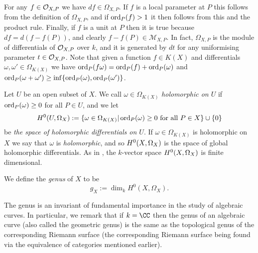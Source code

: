 For any $f \in {\cal O}_{X,P}$ we have $df \in \Omega_{X,P}$.
If $f$ is a local parameter at $P$ this follows from the definition of $\Omega_{X,P}$, and if $\operatorname{ord}_P(f) >1$ it then follows from this and the product rule.
Finally, if $f$ is a unit at $P$ then it is true because $df = d(f - f(P))$, and clearly $f - f(P) \in \mathcal{M}_{X,P}$.
In fact, $\Omega_{X,P}$ is the module of differentials of ${\cal O}_{X,P}$ over $k$, and it is generated by $dt$ for any uniformising parameter $t \in {\cal O}_{X,P}$.
Note that given a function $f \in K(X)$ and differentials $\omega, \omega' \in \Omega_{K(X)}$ we have $\operatorname{ord}_P(f\omega) = \operatorname{ord}_P(f) + \operatorname{ord}_P(\omega)$ and $\operatorname{ord}_P(\omega + \omega') \geq \inf\{\operatorname{ord}_P(\omega), \operatorname{ord}_P(\omega')\}$.


Let $U$ be an open subset of $X$.
We call $\omega \in \Omega_{K(X)}$ \emph{holomorphic on $U$} if $\operatorname{ord}_P(\omega) \geq 0$ for all $P \in U$, and we let
    \[
    H^0(U, \Omega_X) := \{ \omega \in \Omega_{K(X)} | \operatorname{ord}_P(\omega) \geq 0\ \text{for all}\ P \in X\} \cup \{ 0 \}
    \]
be \emph{the space of holomorphic differentials on $U$}.
If $\omega \in \Omega_{K(X)}$ is holomorphic on $X$ we say that $\omega$ is \emph{holomorphic}, and so ${H^0(X,\Omega_X)}$ is the space of global holomorphic differentials.
As in \cite[Chap.\ 8, \S 2, Prop.\ 3]{fulton}, the $k$-vector space ${H^0(X,\Omega_X)}$ is finite dimensional.

    \begin{defn}\label{definitiongenus}
    We define the \emph{genus} of $X$ to be
        \[
        g_X := \dim_k H^0(X,\Omega_X).
        \]
    \end{defn}

The genus is an invariant of fundamental importance in the study of algebraic curves.
In particular, we remark that if $k = \CC$ then the genus of an algebraic curve (also called the geometric genus) is the same as the topological genus of the corresponding Riemann surface (the corresponding Riemann surface being found via the equivalence of categories mentioned earlier).

